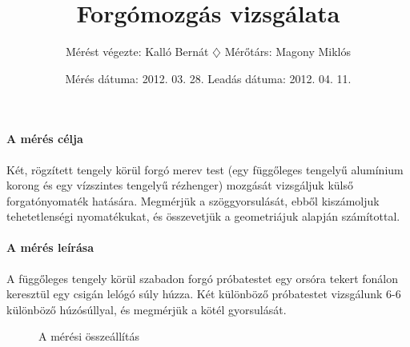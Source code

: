 \documentclass[10pt]{article}
\title{Forgómozgás vizsgálata}
\author{Mérést végezte: Kalló Bernát $\diamondsuit$ Mérőtárs: Magony Miklós}
\date{Mérés dátuma: 2012. 03. 28. Leadás dátuma: 2012. 04. 11.}
\begin{document}
\maketitle

\def\Ms{\ensuremath{M_s}}\def\rho{\ensuremath{\varrho}}\def\Thetamert{\ensuremath{\Theta_{\text{mért}}}}\def\Thetaszam{\ensuremath{\Theta_{\text{szám}}}}\def\DeltaThetamert{\ensuremath{\Delta\ensuremath{\Theta_{\text{mért}}}}}\def\DeltaThetaszam{\ensuremath{\Delta\ensuremath{\Theta_{\text{szám}}}}}\def\deltaThetamert{\ensuremath{\delta\ensuremath{\Theta_{\text{mért}}}}}\def\deltaThetaszam{\ensuremath{\delta\ensuremath{\Theta_{\text{szám}}}}}\def\korong{\text{korong}}\def\rud{\text{rúd}}\def\fonal{\text{fonaltárcsa}}\def\Thetarud{\ensuremath{\ensuremath{\Theta} _{\text{rúd}}}}\def\Thetakorong{\ensuremath{\ensuremath{\Theta}_{\text{korong}}}}\def\mfonal{\ensuremath{m_{\text{fonaltárcsa}}}}


\paragraph*{A mérés célja}
Két, rögzített tengely körül forgó merev test (egy függőleges tengelyű alumínium korong és egy vízszintes tengelyű rézhenger) mozgását vizsgáljuk külső forgatónyomaték hatására. Megmérjük a szöggyorsulását, ebből kiszámoljuk tehetetlenségi nyomatékukat, és összevetjük a geometriájuk alapján számítottal.

\paragraph*{A mérés leírása}
A függőleges tengely körül szabadon forgó próbatestet egy orsóra tekert fonálon keresztül egy csigán lelógó súly húzza.
Két különböző próbatestet vizsgálunk 6-6 különböző húzósúllyal, és megmérjük a kötél gyorsulását.

\begin{figure}[H]
\begin{center}
\end{center}
\caption{A mérési összeállítás}
\end{figure}
\end{document}
